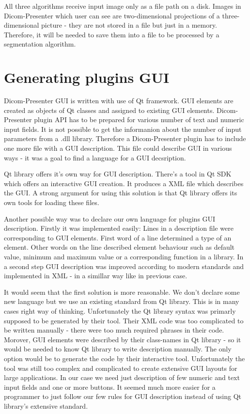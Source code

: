 All three algorithms receive input image only as a file path on a disk. Images in Dicom-Presenter which user can see are two-dimensional projections of a three-dimensional picture - they are not stored in a file but just in a memory. Therefore, it will be needed to save them into a file to be processed by a segmentation algorithm.

\section*{Generating plugins GUI}

Dicom-Presenter GUI is written with use of Qt framework. GUI elements are created as objects of Qt classes and assigned to existing GUI elements. Dicom-Presenter plugin API has to be prepared for various number of text and numeric input fields. It is not possible to get the informanion about the number of input parameters from a .dll library. Therefore a Dicom-Presenter plugin has to include one more file with a GUI description. This file could describe GUI in various ways - it was a goal to find a language for a GUI decsription.

Qt library offers it's own way for GUI description. There's a tool in Qt SDK which offers an interactive GUI creation. It produces a XML file which describes the GUI. A strong argument for using this solution is that Qt library offers its own tools for loading these files.

Another possible way was to declare our own language for plugins GUI description. Firstly it was implemented easily: Lines in a description file were corresponding to GUI elements. First word of a line determined a type of an element. Other words on the line described element behaviour such as default value, minimum and maximum value or a corresponding function in a library. In a second step GUI description was improved according to modern standards and implemented in XML - in a simillar way like in previous case.

It would seem that the first solution is more reasonable. We don't declare some new language but we use an existing standard from Qt library. This is in many cases right way of thinking. Unfortunately the Qt library syntax was primarly supposed to be generated by their tool. Their XML code was too complicated to be written manually - there were too much required phrases in their code. Morover, GUI elements were described by their class-names in Qt library - so it would be needed to know Qt library to write description manually. The only option would be to generate the code by their interactive tool. Unfortunately the tool was still too complex and complicated to create extensive GUI layouts for large applications. In our case we need just description of few numeric and text input fields and one or more buttons. It seemed much more easier for a programmer to just follow our few rules for GUI description instead of using Qt library's extensive standard.

